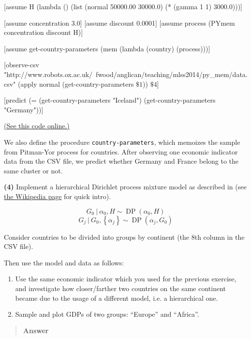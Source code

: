 \documentclass[11pt,reqno]{amsart}
\newif\ifanswers
\newcommand{\+}[1]{\ensuremath{{\mathbf{#1}}}}
\begin{document}
\begin{code}{}{}
[assume H (lambda () (list (normal 50000.00 30000.0) (* (gamma 1 1) 3000.0)))]
                         
[assume concentration 3.0]
[assume discount 0.0001]
[assume process (PYmem concentration discount H)]
                         
[assume get-country-parameters (mem (lambda (country) (process)))]

[observe-csv
  "http://www.robots.ox.ac.uk/~fwood/anglican/teaching/mlss2014/py_mem/data.csv"
  (apply normal (get-country-parameters $\$1$)) $\$4$]
  
[predict (= (get-country-parameters "Iceland")
            (get-country-parameters "Germany"))]
\end{code}
\href{http://www.robots.ox.ac.uk/~fwood/anglican/teaching/mlss2014/py_mem/code/3_2.anglican}{(See this code online.)}

We also define the procedure \texttt{country-parameters}, which memoizes the sample from Pitman-Yor process for countries.
After observing one economic indicator data from the CSV file, we predict whether Germany and France
belong to the same cluster or not.

\fi

\vspace{1cm}
{\bf (4)} Implement a hierarchical Dirichlet process mixture model as described in \citep{teh2004sharing} (see \href{http://en.wikipedia.org/wiki/Hierarchical_Dirichlet_process}{the Wikipedia page} for quick intro).

$$G_0\ |\ \alpha_0, H \sim \operatorname{DP}(\alpha_0, H)$$
$$G_j\ |\ G_0, \left\{\alpha_j\right\} \sim \operatorname{DP}(\alpha_j, G_0)$$

Consider countries to be divided into groups by continent (the 8th column in the CSV file).

Then use the model and data as follows:
\begin{enumerate}
\item Use the same economic indicator which you used for the previous exercise,
and investigate how closer/farther two countries on the same continent became
due to the usage of a different model, i.e. a hierarchical one.

\item Sample and plot GDPs of two groups: ``Europe'' and ``Africa''.
\end{enumerate}

\ifanswers
\begin{quotation}
 {\bf Answer } 
\end{quotation}
\end{document}

